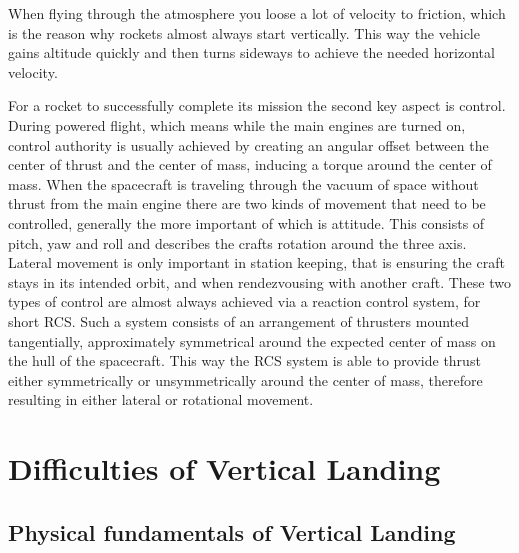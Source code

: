 When flying through the atmosphere you loose a lot of velocity to friction, which is the reason why rockets almost always start vertically. This way the vehicle gains altitude quickly and then turns sideways to achieve the needed horizontal velocity.

For a rocket to successfully complete its mission the second key aspect is control. During powered flight, which means while the main engines are turned on, control authority is usually achieved by creating an angular offset between the center of thrust and the center of mass, inducing a torque around the center of mass. When the spacecraft is traveling through the vacuum of space without thrust from the main engine there are two kinds of movement that need to be controlled, generally the more important of which is attitude. This consists of pitch, yaw and roll and describes the crafts rotation around the three axis. Lateral movement is only important in station keeping, that is ensuring the craft stays in its intended orbit, and when rendezvousing with another craft. These two types of control are almost always achieved via a reaction control system, for short RCS. Such a system consists of an arrangement of thrusters mounted tangentially, approximately symmetrical around the expected center of mass on the hull of the spacecraft. This way the RCS system is able to provide thrust either symmetrically or unsymmetrically around the center of mass, therefore resulting in either lateral or rotational movement.





\section{Difficulties of Vertical Landing}

\subsection{Physical fundamentals of Vertical Landing}


